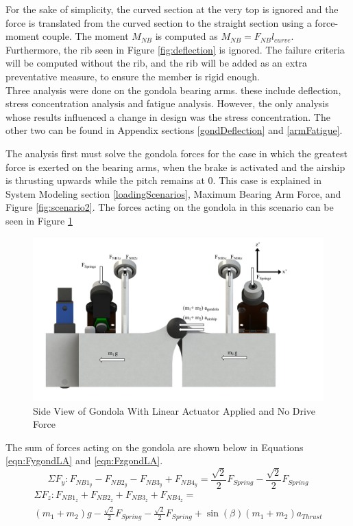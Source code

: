 \documentclass[../main.tex]{subfiles}
\begin{document}
For the sake of simplicity, the curved section at the very top is ignored and the force is translated from the curved section to the straight section using a force-moment couple. The moment $M_{NB}$ is computed as $M_{NB}=F_{NB}l_{curve}$. Furthermore, the rib seen in Figure \ref{fig:deflection} is ignored. The failure criteria will be computed without the rib, and the rib will be added as an extra preventative measure, to ensure the member is rigid enough.\\

Three analysis were done on the gondola bearing arms. these include deflection, stress concentration analysis and fatigue analysis. However, the only analysis whose results influenced a change in design was the stress concentration. The other two can be found in Appendix sections \ref{gondDeflection} and \ref{armFatigue}.

The analysis first must solve the gondola forces for the case in which the greatest force is exerted on the bearing arms, when the brake is activated and the airship is thrusting upwards while the pitch remains at 0. This case is explained in System Modeling section \ref{loadingScenarios}, Maximum Bearing Arm Force, and Figure \ref{fig:scenario2}. The forces acting on the gondola in this scenario can be seen in Figure \ref{fig:sideGondolaLA}
\begin{figure}[H]
	\centering
	\includegraphics[width=1.1\textwidth]{img/gondola/sideGondolaNoDrive.pdf}
	\caption{Side View of Gondola With Linear Actuator Applied and No Drive Force}
	\label{fig:sideGondolaLA}
\end{figure}
 The sum of forces acting on the gondola are shown below in Equations \ref{eqn:FygondLA} and \ref{eqn:FzgondLA}. 
\begin{equation} \label{eqn:FygondLA}
\Sigma F_{y} : F_{NB1_{y}} - F_{NB2_{y}} - F_{NB3_{y}} + F_{NB4_{y}} = \frac{\sqrt{2}}{2} F_{Spring} -\frac{\sqrt{2}}{2} F_{Spring} 
\end{equation}
\begin{multline} \label{eqn:FzgondLA}
\Sigma F_{z} : F_{NB1_{z}} + F_{NB2_{z}} + F_{NB3_{z}} + F_{NB4_{z}} =\\ (m_{1} + m_2)g - \frac{\sqrt{2}}{2} F_{Spring} - \frac{\sqrt{2}}{2} F_{Spring} + \sin(\beta) (m_1+m_2) a_{Thrust}
\end{multline}
 
\end{document}

